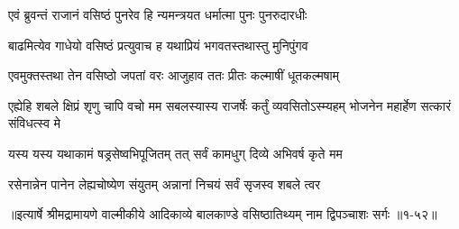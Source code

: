 \twolineshloka
{एवं ब्रुवन्तं राजानं वसिष्ठं पुनरेव हि}
{न्यमन्त्रयत धर्मात्मा पुनः पुनरुदारधीः} %

\twolineshloka
{बाढमित्येव गाधेयो वसिष्ठं प्रत्युवाच ह}
{यथाप्रियं भगवतस्तथास्तु मुनिपुंगव} %

\twolineshloka
{एवमुक्तस्तथा तेन वसिष्ठो जपतां वरः}
{आजुहाव ततः प्रीतः कल्माषीं धूतकल्मषाम्} %

\threelineshloka
{एह्येहि शबले क्षिप्रं शृणु चापि वचो मम}
{सबलस्यास्य राजर्षेः कर्तुं व्यवसितोऽस्म्यहम्}
{भोजनेन महार्हेण सत्कारं संविधत्स्व मे} %

\twolineshloka
{यस्य यस्य यथाकामं षड्रसेष्वभिपूजितम्}
{तत् सर्वं कामधुग् दिव्ये अभिवर्ष कृते मम} %

\twolineshloka
{रसेनान्नेन पानेन लेह्यचोष्येण संयुतम्}
{अन्नानां निचयं सर्वं सृजस्व शबले त्वर} %


॥इत्यार्षे श्रीमद्रामायणे वाल्मीकीये आदिकाव्ये बालकाण्डे वसिष्ठातिथ्यम् नाम द्विपञ्चाशः सर्गः ॥१-५२॥
